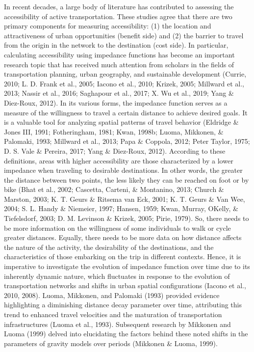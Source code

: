 \documentclass[12pt,twoside]{reedthesis}
\begin{document}
In recent decades, a large body of literature has contributed to assessing the accessibility of active transportation. These studies agree that there are two primary components for measuring accessibility: (1) the location and attractiveness of urban opportunities (benefit side) and (2) the barrier to travel from the origin in the network to the destination (cost side). In particular, calculating accessibility using impedance functions has become an important research topic that has received much attention from scholars in the fields of transportation planning, urban geography, and sustainable development (Currie, 2010; L. D. Frank et al., 2005; Iacono et al., 2010; Krizek, 2005; Millward et al., 2013; Nassir et al., 2016; Saghapour et al., 2017; X. Wu et al., 2019; Yang \& Diez-Roux, 2012). In its various forms, the impedance function serves as a measure of the willingness to travel a certain distance to achieve desired goals. It is a valuable tool for analyzing spatial patterns of travel behavior (Eldridge \& Jones III, 1991; Fotheringham, 1981; Kwan, 1998b; Luoma, Mikkonen, \& Palomaki, 1993; Millward et al., 2013; Papa \& Coppola, 2012; Peter Taylor, 1975; D. S. Vale \& Pereira, 2017; Yang \& Diez-Roux, 2012). According to these definitions, areas with higher accessibility are those characterized by a lower impedance when traveling to desirable destinations. In other words, the greater the distance between two points, the less likely they can be reached on foot or by bike (Bhat et al., 2002; Cascetta, Carteni, \& Montanino, 2013; Church \& Marston, 2003; K. T. Geurs \& Ritsema van Eck, 2001; K. T. Geurs \& Van Wee, 2004; S. L. Handy \& Niemeier, 1997; Hansen, 1959; Kwan, Murray, OKelly, \& Tiefelsdorf, 2003; D. M. Levinson \& Krizek, 2005; Pirie, 1979). So, there needs to be more information on the willingness of some individuals to walk or cycle greater distances. Equally, there needs to be more data on how distance affects the nature of the activity, the desirability of the destinations, and the characteristics of those embarking on the trip in different contexts. Hence, it is imperative to investigate the evolution of impedance function over time due to its inherently dynamic nature, which fluctuates in response to the evolution of transportation networks and shifts in urban spatial configurations (Iacono et al., 2010, 2008). Luoma, Mikkonen, and Palomaki (1993) provided evidence highlighting a diminishing distance decay parameter over time, attributing this trend to enhanced travel velocities and the maturation of transportation infrastructures (Luoma et al., 1993). Subsequent research by Mikkonen and Luoma (1999) delved into elucidating the factors behind these noted shifts in the parameters of gravity models over periods (Mikkonen \& Luoma, 1999).
\end{document}
